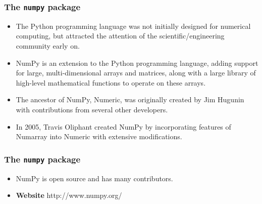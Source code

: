 \documentclass[MASTER.tex]{subfiles}
\begin{document}
\begin{frame}
\frametitle{The \texttt{numpy} package}
\Large
\begin{itemize}
\item The Python programming language was not initially designed for numerical computing, but attracted the attention of the scientific/engineering community early on.

\item NumPy is an extension to the Python programming language, adding support for large, multi-dimensional arrays and matrices, along with a large library of high-level mathematical functions to operate on these arrays. 
\end{itemize}
\end{frame}
\begin{frame}
\begin{itemize}
\item The ancestor of NumPy, Numeric, was originally created by Jim Hugunin with contributions from several other developers. 
\item In 2005, Travis Oliphant created NumPy by incorporating features of Numarray into Numeric with extensive modifications. 
\end{itemize}

\end{frame}
\begin{frame}
\frametitle{The \texttt{numpy} package}
\Large	
	
\begin{itemize}
\item NumPy is open source and has many contributors.
\item \textbf{Website} http://www.numpy.org/
\end{itemize}

\end{frame}
\end{document}
